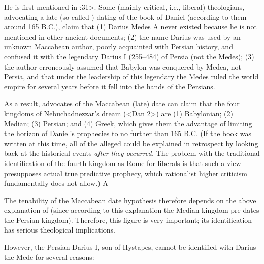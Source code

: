 
He is first mentioned in :31>. Some (mainly critical, i.e., liberal) theologians, advocating a late (so-called ) dating of the book of Daniel (according to them around 165 B.C.), claim that
(1) Darius Medes 
\insertCite A\left
never existed because he is not mentioned in other ancient documents; (2) the name Darius was used by an unknown Maccabean author, poorly acquainted with Persian
history, and confused it with the legendary Darius I (255--484) of Persia (not the Medes); (3) the author erroneously assumed that Babylon was conquered by Medea, not Persia, and that under the leadership of this
legendary  the Medes ruled the world empire for several years before it fell into the hands of the Persians.

As a result, advocates of the Maccabean (late) date can claim that the four kingdoms of Nebuchadnezzar's dream (<Dan 2>) are (1) Babylonian; (2) Median; (3) Persian; and (4) Greek, which
gives them the advantage of limiting the horizon of Daniel's prophecies to no further than 165 B.C. (If the book was written at this time, all of the alleged  could be explained in retrospect by looking back at the historical events {\it after they occurred.\/} The problem with the traditional identification of the fourth kingdom as Rome for liberals is that such a view presupposes actual true predictive prophecy, which rationalist higher criticism fundamentally does not allow.)
\insertCite A\right

The tenability of the Maccabean date hypothesis therefore depends on the above explanation of  (since according to this explanation the Median kingdom pre-dates the Persian kingdom).
Therefore, this figure is very important; its identification has serious theological implications.

However, the Persian Darius I, son of Hystapes, cannot be identified with Darius the Mede for several reasons:




